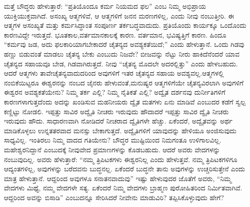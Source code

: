 ಮತ್ತೆ ಬೌದ್ಧರು ಹೇಳುತ್ತಾರೆ: “ಪ್ರತಿಯೊಂದೂ ಕರ್ಮ ನಿಯಮದ ಫಲ” ಎಂಬ ನಿಮ್ಮ ಅಭಿಪ್ರಾಯ ಯುಕ್ತಿಯುಕ್ತವಾಗಿದೆ. ಅಸಂಖ್ಯ ಆತ್ಮಗಳಿವೆ, ಆ ಆತ್ಮಗಳಿಗೆ ಜನನ ಮರಣಗಳಿಲ್ಲ, ಎಂದು ನೀವು ನಂಬುತ್ತೀರಿ. ಈ ಆತ್ಮಗಳ ಅಸಂಖ್ಯತೆ ಮತ್ತು ಕರ್ಮಸಿದ್ಧಾಂತ ಸಂಪೂರ್ಣ ತರ್ಕಬದ್ಧವಾದುದು. ಪ್ರತಿಯೊಂದು ಕಾರ್ಯಕ್ಕೂ ಒಂದೊಂದು ಕಾರಣವಿದ್ದೇ ಇರುತ್ತದೆ. ಭೂತಕಾಲ,\break ವರ್ತಮಾನಕಾಲಕ್ಕೆ ಕಾರಣ. ವರ್ತಮಾನ, ಭವಿಷ್ಯತ್ತಿಗೆ ಕಾರಣ. ಹಿಂದೂ “ಕರ್ಮವು ಜಡ, ಅದು ಫಲಕಾರಿಯಾಗಬೇಕಾದರೆ ಚೈತನ್ಯದ ಅವಶ್ಯಕತೆಯಿದೆ;” ಎಂದು ಹೇಳುತ್ತಾನೆ. ಒಂದು ಗಿಡವು ಹಣ್ಣು ಬಿಡುವಂತೆ ಮಾಡಲು ಚೈತನ್ಯ ಬೇಕು ಎಂಬುದು ನಿಜವೇ? ಬೀಜವನ್ನು ನೆಟ್ಟು ನೀರು ಹಾಕಿದೆನೆಂದರೆ ಯಾವ ಚೈತನ್ಯದ ಸಹಾಯವೂ ಬೇಡ, ಗಿಡವಾಗಿರುತ್ತದೆ. ನೀವು “ಚೈತನ್ಯ ಮೊದಲೇ ಅದರಲ್ಲಿತ್ತು” ಎಂದು ಹೇಳಬಹುದು. ಆದರೆ ಆತ್ಮಗಳು ತಾವೇ\break ಚೈತನ್ಯವಾದುದರಿಂದ ಅವುಗಳಿಗೆ ಇತರ ಚೈತನ್ಯದ ಸಹಾಯ ಅವಶ್ಯವಲ್ಲ.\break ಆತ್ಮಗಳಲ್ಲಿ ನಂಬಿಕೆಯಿಟ್ಟರೂ ಈಶ್ವರನನ್ನು ನಂಬದ ಜೈನರು ಹೇಳುವಂತೆ,\break ಮನುಷ್ಯರ ಆತ್ಮಗಳಿಗೆಯೇ ಚೈತನ್ಯವಿರಲಾಗಿ ಅವುಗಳಿಗೆ ಈಶ್ವರನ ಅವಶ್ಯಕತೆಯೇನು? ನಿಮ್ಮ ತರ್ಕ ಎಲ್ಲಿ? ನಿಮ್ಮ ನೈತಿಕತೆ ಎಲ್ಲಿ? ಅದ್ವೈತ ದರ್ಶನವು ದುರ್ನೀತಿಗಳಿಗೆ ಕಾರಣಗಳಾಗುತ್ತದೆಂದು ಅದನ್ನು ಖಂಡಿಸುವ ಮಹನೀಯರು ದ್ವೈತ ಮತಗಳು ಏನು ಮಾಡಿವೆ ಎಂಬುದರ ಕಡೆಗೆ ಸ್ವಲ್ಪ ಕಣ್ಣಿಟ್ಟು ನೋಡಲಿ. ಇಪ್ಪತ್ತು ಸಾವಿರ ಅದ್ವೈತಿ ನೀಚರು ಇರುವುದು ಹೌದಾದರೆ ಇಪ್ಪತ್ತು ಸಾವಿರ ದ್ವೈತಿ ನೀಚರು ಇರುವುದು ಹೌದು. ಸಾಧಾರಣವಾಗಿ ನೋಡಿದರೆ ನೀಚರಾದ ದ್ವೈತಿಗಳೇ ಹೆಚ್ಚು. ಏಕೆಂದರೆ, ಅದ್ವೈತವನ್ನು ಅರ್ಥ ಮಾಡಿಕೊಳ್ಳಲು ಉನ್ನತತರವಾದ ಮನಸ್ಸು ಬೇಕಾಗುತ್ತದೆ. ಅದ್ವೈತಿಗಳಿಗೆ ಯಾವುದನ್ನು ಹೇಳಿಯೂ ಅಂಜಿಸುವುದು ಸಾಧ್ಯವಿಲ್ಲ. ಇಂತಿರಲು ನಿಮ್ಮ ವಾದದ ಗತಿಯೇನು? ಬೌದ್ಧರ ಮುಷ್ಟಿಯಿಂದ ನಿಮಗಂತೂ ಉಳಿಗಾಲವಿಲ್ಲ. ಮಹೇಶ್ವರನಿದ್ದಾನೆ ಎಂಬುದಕ್ಕೆ ನೀವು\break ವೇದ ಪ್ರಮಾಣಗಳನ್ನು ಕೊಡಬಹುದು. ಆದರೆ ಅವರು ವೇದಗಳನ್ನು ನಂಬುವು\-ದಿಲ್ಲ. ಅವರು ಹೆಳುತ್ತಾರೆ: “ನಮ್ಮ ತ್ರಿಪಿಟಕಗಳು ಈಶ್ವರನಿಲ್ಲ ಎಂದು ಹೇಳುತ್ತವೆ. ನಮ್ಮ ತ್ರಿಪಿಟಕಗಳಿಗೂ ಆದ್ಯಂತಗಳಿಲ್ಲ, ಅವುಗಳನ್ನು ಬರೆದವನು ಬುದ್ಧನಲ್ಲ. ಏಕೆಂದರೆ ಬುದ್ಧನೇ ತಾನು ಅವುಗಳನ್ನು ಉಚ್ಚರಿಸುತ್ತೇನೆ ಎಂದು ಮಾತ್ರ ಹೇಳುತ್ತಾನೆ. ಆದ್ದರಿಂದ ಅವುಗಳೂ ಸನಾತನವಾದುವು” ಇಷ್ಟು ಹೇಳುವುದರ ಜೊತೆಗೆ ಅವರು, “ನಿಮ್ಮ ವೇದಗಳು ಮಿಥ್ಯೆ, ನಮ್ಮ ವೇದಗಳೇ ಸತ್ಯ. ಏಕೆಂದರೆ ನಿಮ್ಮ ವೇದಗಳು ಬ್ರಾಹ್ಮಣ ಪುರೋಹಿತರಿಂದ ನಿರ್ಮಿತವಾಗಿವೆ. ಆದ್ದರಿಂದ ಅವನ್ನು ಬಿಸಾಡಿ” ಎಂಬುದನ್ನೂ ಸೇರಿಸಿದರೆ ನೀವೇನು ಮಾಡುವಿರಿ? ತಪ್ಪಿಸಿಕೊಳ್ಳುವುದು ಹೇಗೆ?

